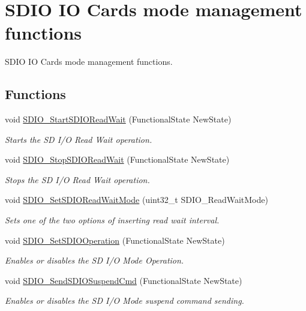 \hypertarget{group___s_d_i_o___group4}{}\section{S\+D\+I\+O I\+O Cards mode management functions}
\label{group___s_d_i_o___group4}


S\+D\+I\+O I\+O Cards mode management functions.  


\subsection*{Functions}
\begin{DoxyCompactItemize}
\item 
void \hyperlink{group___s_d_i_o___group4_gac88f914d9a68a83abc2265ec8a7b79fc}{S\+D\+I\+O\+\_\+\+Start\+S\+D\+I\+O\+Read\+Wait} (Functional\+State New\+State)
\begin{DoxyCompactList}\small\item\em Starts the S\+D I/\+O Read Wait operation. \end{DoxyCompactList}\item 
void \hyperlink{group___s_d_i_o___group4_gaca6b25eb2debb73ac827c66f0ebcf837}{S\+D\+I\+O\+\_\+\+Stop\+S\+D\+I\+O\+Read\+Wait} (Functional\+State New\+State)
\begin{DoxyCompactList}\small\item\em Stops the S\+D I/\+O Read Wait operation. \end{DoxyCompactList}\item 
void \hyperlink{group___s_d_i_o___group4_ga2baac4ea1bb6c2d94345d2712604338a}{S\+D\+I\+O\+\_\+\+Set\+S\+D\+I\+O\+Read\+Wait\+Mode} (uint32\+\_\+t S\+D\+I\+O\+\_\+\+Read\+Wait\+Mode)
\begin{DoxyCompactList}\small\item\em Sets one of the two options of inserting read wait interval. \end{DoxyCompactList}\item 
void \hyperlink{group___s_d_i_o___group4_ga24e210c185d5a7855cbaff4472a8f8d1}{S\+D\+I\+O\+\_\+\+Set\+S\+D\+I\+O\+Operation} (Functional\+State New\+State)
\begin{DoxyCompactList}\small\item\em Enables or disables the S\+D I/\+O Mode Operation. \end{DoxyCompactList}\item 
void \hyperlink{group___s_d_i_o___group4_ga9264137a01a1ab81d03bc80a3b3120fc}{S\+D\+I\+O\+\_\+\+Send\+S\+D\+I\+O\+Suspend\+Cmd} (Functional\+State New\+State)
\begin{DoxyCompactList}\small\item\em Enables or disables the S\+D I/\+O Mode suspend command sending. \end{DoxyCompactList}\end{DoxyCompactItemize}


